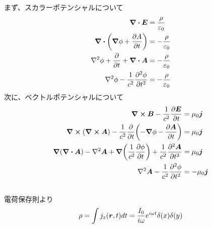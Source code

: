 \documentclass[../../sp_2017.tex]{subfiles}
\begin{document}
\subsection{}
まず、スカラーポテンシャルについて
\begin{equation}\begin{aligned}[b]
    \div \vb*{E}&=\frac{\rho}{\varepsilon_0}\\
    \div\qty(\grad\phi+\pdv{A}{t}) &=-\frac{\rho}{\varepsilon_0}\\
    \laplacian\phi+\pdv{t}+\div{\vb*{A}} &= -\frac{\rho}{\varepsilon_0}\\
    \laplacian\phi-\frac{1}{c^2}\pdv[2]{\phi}{t} &= -\frac{\rho}{\varepsilon_0}
\end{aligned}\end{equation}
次に、ベクトルポテンシャルについて
\begin{equation}\begin{aligned}[b]
   \curl\vb*{B}-\frac{1}{c^2}\pdv{\vb*{E}}{t} &= \mu_0 \vb*{j}\\
   \curl(\curl\vb*{A})-\frac{1}{c^2}\pdv{t}\qty(-\grad\phi-\pdv{\vb*{A}}{t}) &= \mu_0\vb*{j}\\
   \grad(\div\vb*{A})-\laplacian\vb*{A}+\grad\qty(\frac{1}{c^2}\pdv{\phi}{t})+\frac{1}{c^2}\pdv[2]{\vb*{A}}{t} &= \mu_0 \vb*{j}\\
    \laplacian \vb*{A}-\frac{1}{c^2}\pdv[2]{\phi}{t} &= -\mu_0 \vb*{j}
\end{aligned}\end{equation}

\subsection{}
電荷保存則より
\begin{equation}\begin{aligned}[b]
    \rho = \int j_z(\vb*{r},t) dt = \frac{I_0}{i\omega}e^{i\omega t}\delta(x)\delta(y)
\end{aligned}\end{equation}
\end{document}
